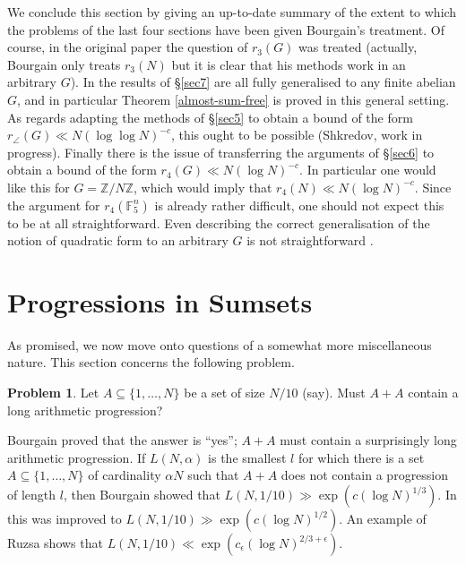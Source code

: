\documentclass[12pt,a4paper,reqno]{amsart}
\numberwithin{equation}{section}
\theoremstyle{plain}
\theoremstyle{definition}
\newtheorem{problem}[subsection]{Problem}
\begin{document}
\noindent We conclude this section by giving an up-to-date summary of the extent to which the problems of the last four sections have been given Bourgain's treatment. Of course, in the original paper \cite{bourgain2} the question of $r_3(G)$ was treated (actually, Bourgain only treats $r_3(N)$ but it is clear that his methods work in an arbitrary $G$). In \cite{green-reg} the results of \S \ref{sec7} are all fully generalised to any finite abelian $G$, and in particular Theorem \ref{almost-sum-free} is proved in this general setting. As regards adapting the methods of \S \ref{sec5} to obtain a bound of the form $r_{\angle}(G) \ll N(\log \log N)^{-c}$, this ought to be possible (Shkredov, work in progress). Finally there is the issue of transferring the arguments of \S \ref{sec6} to obtain a bound of the form $r_4(G) \ll N(\log N)^{-c}$. In particular one would like this for $G = \mathbb{Z}/N\mathbb{Z}$, which would imply that $r_4(N) \ll N(\log N)^{-c}$. Since the argument for $r_4(\mathbb{F}_5^n)$ is already rather difficult, one should not expect this to be at all straightforward. Even describing the correct generalisation of the notion of quadratic form to an arbitrary $G$ is not straightforward \cite{green-tao-manifesto}.


\section{Progressions in Sumsets}\label{sec9}

\noindent As promised, we now move onto questions of a somewhat more miscellaneous nature. This section concerns the following problem.
\begin{problem}\label{sumset-aps}
Let $A \subseteq \{1,\dots,N\}$ be a set of size $N/10$ \textup{(}say\textup{)}. Must $A + A$ contain a long arithmetic progression?
\end{problem}
\noindent Bourgain \cite{bourgain1} proved that the answer is ``yes''; $A + A$ must contain a surprisingly long arithmetic progression. If $L(N,\alpha)$ is the smallest $l$ for which there is a set $A \subseteq \{1,\dots,N\}$ of cardinality $\alpha N$ such that $A + A$ does not contain a progression of length $l$, then Bourgain showed that $L(N,1/10) \gg \exp(c(\log N)^{1/3})$. In \cite{green-aps-sumsets} this was improved to $L(N,1/10) \gg \exp(c(\log N)^{1/2})$. An example of Ruzsa \cite{ruzsa-niveau} shows that $L(N,1/10) \ll \exp(c_{\epsilon}(\log N)^{2/3 + \epsilon})$.\vspace{11pt}
\end{document}
